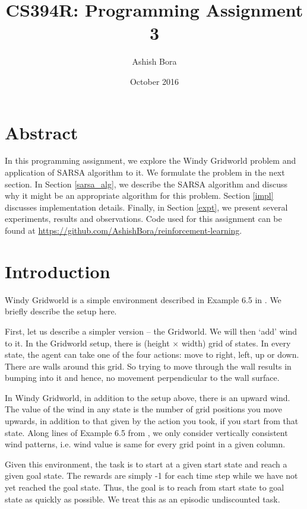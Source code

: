 \documentclass{article}
\title{CS394R: Programming Assignment 3}
\author{Ashish Bora}
\date{October 2016}
\begin{document}
\maketitle

\section{Abstract}

In this programming assignment, we explore the Windy Gridworld problem and application of SARSA algorithm to it. We formulate the problem in the next section. In Section \ref{sarsa_alg}, we describe the SARSA algorithm and discuss why it might be an appropriate algorithm for this problem. Section \ref{impl} discusses implementation details. Finally, in Section \ref{expt}, we present several experiments, results and observations. Code used for this assignment can be found at \url{https://github.com/AshishBora/reinforcement-learning}.

\section{Introduction}

Windy Gridworld is a simple environment described in Example 6.5 in \cite{RLbook}. We briefly describe the setup here.

First, let us describe a simpler version -- the Gridworld. We will then `add' wind to it. In the Gridworld setup, there is (height $\times$ width) grid of states. In every state, the agent can take one of the four actions: move to right, left, up or down. There are walls around this grid. So trying to move through the wall results in bumping into it and hence, no movement perpendicular to the wall surface.

In Windy Gridworld, in addition to the setup above, there is an upward wind. The value of the wind in any state is the number of grid positions you move upwards, in addition to that given by the action you took, if you start from that state. Along lines of Example 6.5 from \cite{RLbook}, we only consider vertically consistent wind patterns, i.e. wind value is same for every grid point in a given column.

Given this environment, the task is to start at a given start state and reach a given goal state. The rewards are simply -1 for each time step while we have not yet reached the goal state. Thus, the goal is to reach from start state to goal state as quickly as possible. We treat this as an episodic undiscounted task.
\end{document}

